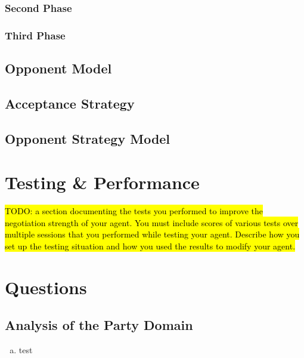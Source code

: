 \documentclass[a4paper,10pt]{article}
\newcommand{\todo}[1] {\hl{TODO: #1}}
\begin{document}
\subsubsection{Second Phase}

\subsubsection{Third Phase}



\subsection{Opponent Model}
\label{sec:strategyOM}

\subsection{Acceptance Strategy}
\label{sec:strategyAS}

\subsection{Opponent Strategy Model}
\label{sec:strategyOMS}

\section{Testing \& Performance}
\label{sec:performance}
\todo{a section documenting the tests you performed to improve the negotiation strength of your agent. You must include scores of various tests over multiple sessions that you performed while testing your agent. Describe how you set up the testing situation and how you used the results to modify your agent.}

\section{Questions}
\label{sec:questions}

\subsection{Analysis of the Party Domain}

\begin{enumerate}[(a)]

\item{test}

\end{enumerate}
\end{document}
